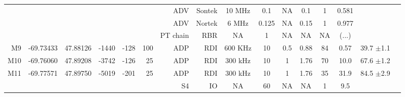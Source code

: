\documentclass[letterpaper,10pt,landscape]{article}
\begin{document}
\begin{table}
\begin{tabular}{|r|c|c|r|r|r|r|r|c|c|c|c|c|c|c|c|}
    ~                   &                            &                           &                        &                      &                     & ADV          & Sontek     & 10 MHz    & 0.1       & NA       & 0.1        & 1          & 0.581      &                                    \\ 
    ~                   &                            &                           &                        &                      &                     & ADV          & Nortek     & 6 MHz     & 0.125     & NA       & 0.15       & 1          & 0.977      &                                    \\ %
    ~                   &                            &                           &                        &                      &                     & PT chain     & RBR        & NA        & 1         & NA       & NA         & NA         & (...)      &                                    \\\hline
    M9                  & -69.73433                  & 47.88126                  & -1440                  & -128                 & 100                 & ADP          & RDI        & 600 KHz   & 10        & 0.5      & 0.88       & 84         & 0.57       &  39.7 $\pm$1.1                     \\\hline
    M10                 & -69.76060                  & 47.89208                  & -3742                  & -126                 & 25                  & ADP          & RDI        & 300 kHz   & 10        & 1        & 1.76       & 70         & 10.0       &  67.6 $\pm$1.2                     \\\hline
    \multirow{2}{*}{M11}& \multirow{2}{*}{-69.77571} & \multirow{2}{*}{47.89750} & \multirow{2}{*}{-5019} & \multirow{2}{*}{-201}& \multirow{2}{*}{25} & ADP          & RDI        & 300 kHz   & 10        & 1        & 1.76       & 35         & 31.9       &  \multirow{2}{*}{84.5 $\pm$2.9}    \\
    ~                   &                            &                           &                        &                      &                     & S4           & IO         & NA        & 60        & NA       & NA         & 1          & 9.5        &                                    \\\hline
 \end{tabular}


\end{table}
\end{document}
